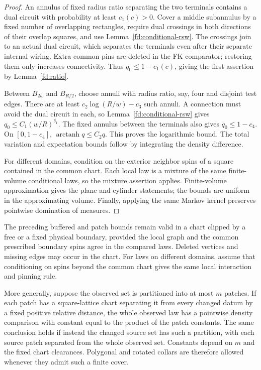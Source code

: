 \begin{proof}
An annulus of fixed radius ratio separating the two terminals contains a
dual circuit with probability at least \(c_1(c)>0\).  Cover a middle
subannulus by a fixed number of overlapping rectangles, require dual
crossings in both directions of their overlap squares, and use
Lemma~\ref{fd:conditional-rsw}.  The crossings join to an actual dual
circuit, which separates the terminals even after their separate internal
wiring.  Extra common pins are deleted in the FK comparator; restoring
them only increases connectivity.  Thus \(q_0\le1-c_1(c)\), giving the
first assertion by Lemma~\ref{fd:ratio}.

Between \(B_{2w}\) and \(B_{R/2}\), choose annuli with radius ratio, say,
four and disjoint test edges.  There are at least
\(c_2\log(R/w)-c_3\) such annuli.  A connection must avoid the dual
circuit in each, so Lemma~\ref{fd:conditional-rsw} gives
\(q_0\le C_1(w/R)^{\delta_1}\).
The fixed annulus between the terminals also gives \(q_0\le1-c_4\).
On \([0,1-c_4]\), \(\operatorname{arctanh}q\le C_2q\).
This proves the logarithmic bound.  The total variation and expectation
bounds follow by integrating the density difference.

For different domains, condition on the exterior neighbor spins of a
square contained in the common chart.  Each local law is a mixture of
the same finite-volume conditional laws, so the mixture assertion applies.
Finite-volume approximation gives the plane and cylinder statements;
the bounds are uniform in the approximating volume.  Finally, applying
the same Markov kernel preserves pointwise domination of measures.
\end{proof}

\begin{corollary}
\label{fd:finite-cover}
The preceding buffered and patch bounds remain valid in a chart clipped
by a free or a fixed physical boundary, provided the local graph and
the common prescribed boundary spins agree in the compared laws.
Deleted vertices and missing edges may occur in the chart. For laws on
different domains, assume that conditioning on spins beyond the common
chart gives the same local interaction and pinning rule.

More generally, suppose the observed set is partitioned into at most
$m$ patches. If each patch has a square-lattice chart separating it
from every changed datum by a fixed positive relative distance, the
whole observed law has a pointwise density comparison with constant
equal to the product of the patch constants. The same conclusion holds
if instead the changed source set has such a partition, with each
source patch separated from the whole observed set. Constants depend
on $m$ and the fixed chart clearances. Polygonal and rotated collars
are therefore allowed whenever they admit such a finite cover.
\end{corollary}

